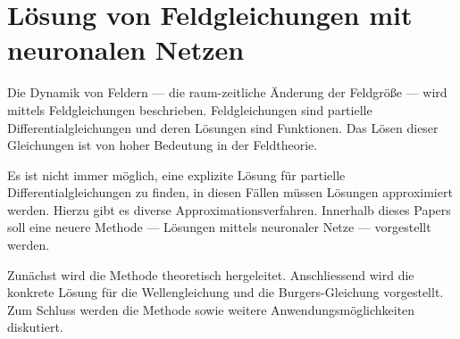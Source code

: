 %
%
%
%
\chapter{Lösung von Feldgleichungen mit neuronalen Netzen\label{chapter:neuronal}}
\begin{refsection}

Die Dynamik von Feldern --- die raum-zeitliche Änderung der Feldgröße --- wird mittels Feldgleichungen beschrieben.
%
Feldgleichungen sind partielle Differentialgleichungen und deren Lösungen sind Funktionen.
Das Lösen dieser Gleichungen ist von hoher Bedeutung in der Feldtheorie.

Es ist nicht immer möglich, eine explizite Lösung für partielle Differentialgleichungen zu finden, in diesen Fällen müssen Lösungen approximiert werden.
Hierzu gibt es diverse Approximationsverfahren.
Innerhalb dieses Papers soll eine neuere Methode --- Lösungen mittels neuronaler Netze --- vorgestellt werden.
%

Zunächst wird die Methode theoretisch hergeleitet.
Anschliessend wird die konkrete Lösung für die Wellengleichung und die Burgers-Gleichung vorgestellt.
%
Zum Schluss werden die Methode sowie weitere Anwendungsmöglichkeiten diskutiert.






\printbibliography[heading=subbibliography]
\end{refsection}
